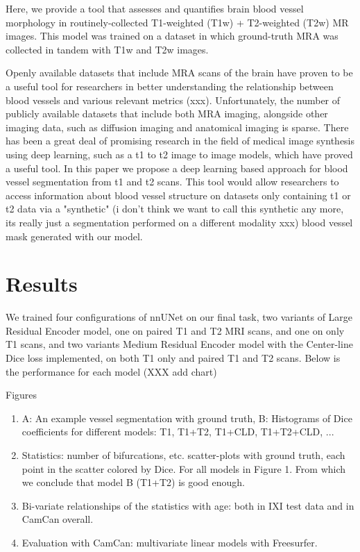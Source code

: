 \documentclass[pdflatex,sn-mathphys-num]{sn-jnl}
\begin{document}
Here, we provide a tool that assesses and quantifies brain blood vessel morphology in routinely-collected T1-weighted (T1w) + T2-weighted (T2w) MR images. This model was trained on a dataset in which ground-truth MRA was collected in tandem with T1w and T2w images.

Openly available datasets that include MRA scans of the brain have proven to be a useful tool for researchers in better understanding the relationship between blood vessels and various relevant metrics (xxx). Unfortunately, the number of publicly available datasets that include both MRA imaging, alongside other imaging data, such as diffusion imaging and anatomical imaging is sparse. There has been a great deal of promising research in the field of medical image synthesis using deep learning, such as a t1 to t2 image to image models, which have proved a useful tool. In this paper we propose a deep learning based approach for blood vessel segmentation from t1 and t2 scans. This tool would allow researchers to access information about blood vessel structure on datasets only containing t1 or t2 data via a "synthetic" (i don't think we want to call this synthetic any more, its really just a segmentation performed on a different modality xxx) blood vessel mask generated with our model.

\section{Results}

We trained four configurations of nnUNet on our final task, two variants of Large Residual Encoder model, one on paired T1 and T2 MRI scans, and one on only T1 scans, and two variants Medium Residual Encoder model with the Center-line Dice loss implemented, on both T1 only and paired T1 and T2 scans. Below is the performance for each model (XXX add chart)

Figures
\begin{enumerate}
    \item A: An example vessel segmentation with ground truth, B: Histograms of Dice coefficients for different models: T1, T1+T2, T1+CLD, T1+T2+CLD, ...
    \item Statistics: number of bifurcations, etc. scatter-plots with ground truth, each point in the scatter colored by Dice. For all models in Figure 1. From which we conclude that model B (T1+T2) is good enough.
    \item Bi-variate relationships of the statistics with age: both in IXI test data and in CamCan overall.
    \item Evaluation with CamCan: multivariate linear models with Freesurfer.
\end{enumerate}
\end{document}
